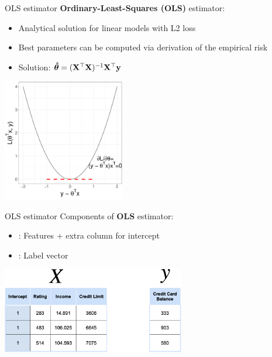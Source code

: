 \documentclass[11pt,compress,t,notes=noshow, xcolor=table]{beamer}
\begin{document}
\begin{vbframe}{OLS estimator}
\small \textbf{Ordinary-Least-Squares (OLS)} estimator: 
\begin{itemize}
    \item \small Analytical solution for linear models with L2 loss
    \item \small Best parameters can be computed via derivation of the empirical risk
    \item \small Solution:  $\bm{\hat\theta} = (\mathbf{X}^\top \mathbf{X})^{-1} \mathbf{X}^\top \mathbf{y}$
\end{itemize}

\begin{center}
 \includegraphics[width =0.4\textwidth]{figure/nutshell-regression-derivative-L2.pdf}
\end{center}
\end{vbframe}
   




\begin{vbframe}{OLS estimator}
Components of \textbf{OLS} estimator:
\begin{itemize}
    \item \Xmat: Features + extra column for intercept
    \item \yv: Label vector
\end{itemize}
\vspace{0.7 cm}
  \includegraphics[width = 0.6\textwidth]{figure_man/nutshell-regression-design-matrix.png}


\end{vbframe}
\end{document}
